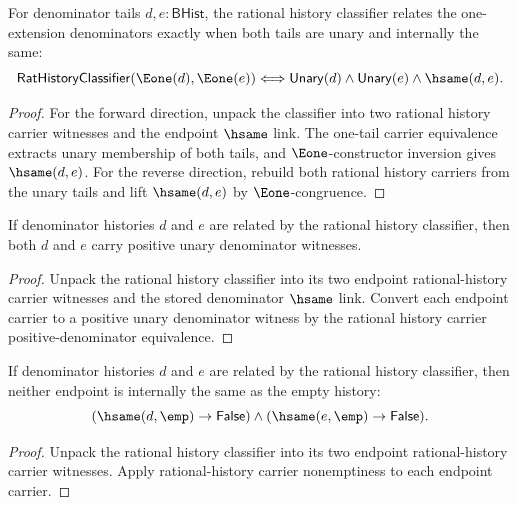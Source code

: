 \begin{theorem}
\label{thm:rat-history-classifier-e1-tail-unary-iff}
For denominator tails \(d,e:\mathsf{BHist}\), the rational history classifier
relates the one-extension denominators exactly when both tails are unary and
internally the same:
$$
\mathsf{RatHistoryClassifier}(\Eone(d),\Eone(e))
\Longleftrightarrow
\mathsf{Unary}(d)\land \mathsf{Unary}(e)\land \hsame(d,e).
$$
\end{theorem}
\begin{proof}
For the forward direction, unpack the classifier into two rational history
carrier witnesses and the endpoint \(\hsame\) link. The one-tail carrier
equivalence extracts unary membership of both tails, and \(\Eone\)-constructor
inversion gives \(\hsame(d,e)\). For the reverse direction, rebuild both
rational history carriers from the unary tails and lift \(\hsame(d,e)\) by
\(\Eone\)-congruence.
\end{proof}

\begin{theorem}
\label{thm:rat-history-classifier-positive-denominators}
If denominator histories $d$ and $e$ are related by the rational history
classifier, then both $d$ and $e$ carry positive unary denominator witnesses.
\end{theorem}
\begin{proof}
Unpack the rational history classifier into its two endpoint rational-history
carrier witnesses and the stored denominator $\hsame$ link. Convert each
endpoint carrier to a positive unary denominator witness by the rational history
carrier positive-denominator equivalence.
\end{proof}

\begin{theorem}
\label{thm:rat-history-classifier-endpoints-not-empty}
If denominator histories $d$ and $e$ are related by the rational history
classifier, then neither endpoint is internally the same as the empty history:
$$
(\hsame(d,\emp)\to\mathsf{False})\land
(\hsame(e,\emp)\to\mathsf{False}).
$$
\end{theorem}
\begin{proof}
Unpack the rational history classifier into its two endpoint rational-history
carrier witnesses. Apply rational-history carrier nonemptiness to each endpoint
carrier.
\end{proof}

